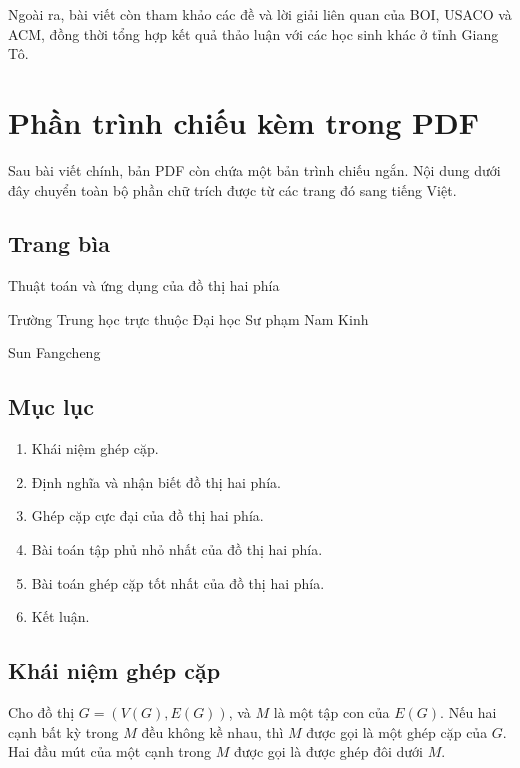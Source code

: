 \documentclass[11pt]{article}
\begin{document}
Ngoài ra, bài viết còn tham khảo các đề và lời giải liên quan của BOI, USACO
và ACM, đồng thời tổng hợp kết quả thảo luận với các học sinh khác ở tỉnh
Giang Tô.

\section{Phần trình chiếu kèm trong PDF}

Sau bài viết chính, bản PDF còn chứa một bản trình chiếu ngắn. Nội dung dưới
đây chuyển toàn bộ phần chữ trích được từ các trang đó sang tiếng Việt.

\subsection*{Trang bìa}

\begin{center}
\Large Thuật toán và ứng dụng của đồ thị hai phía

\normalsize Trường Trung học trực thuộc Đại học Sư phạm Nam Kinh

Sun Fangcheng
\end{center}

\subsection*{Mục lục}

\begin{enumerate}
  \item Khái niệm ghép cặp.
  \item Định nghĩa và nhận biết đồ thị hai phía.
  \item Ghép cặp cực đại của đồ thị hai phía.
  \item Bài toán tập phủ nhỏ nhất của đồ thị hai phía.
  \item Bài toán ghép cặp tốt nhất của đồ thị hai phía.
  \item Kết luận.
\end{enumerate}

\subsection*{Khái niệm ghép cặp}

Cho đồ thị \(G=(V(G),E(G))\), và \(M\) là một tập con của \(E(G)\). Nếu hai
cạnh bất kỳ trong \(M\) đều không kề nhau, thì \(M\) được gọi là một ghép
cặp của \(G\). Hai đầu mút của một cạnh trong \(M\) được gọi là được ghép đôi
dưới \(M\).
\end{document}
